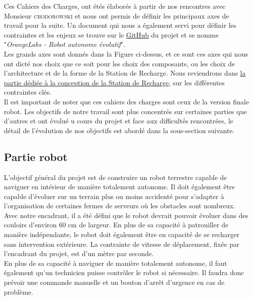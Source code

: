 \documentclass[french]{rapportENSTAB}
\begin{document}
Ces Cahiers des Charges, ont étés élaborés à partir de nos rencontres avec Monsieur \textsc{chodorowski} et nous ont permis de définir les principaux axes de travail pour la suite. Un document qui nous a également servi pour définir les contraintes et les enjeux se trouve sur le  \href{https://github.com/AntoninLize/Projet_OrangeLabs}{GitHub} du projet et se nomme "\textit{OrangeLabs - Robot autonome évolutif}".\\

Les grands axes sont donnés dans la Figure ci-dessus, et ce sont ces axes qui nous ont dicté nos choix que ce soit pour les choix des composants, ou les choix de l'architecture et de la forme de la Station de Recharge. Nous reviendrons dans \hyperlink{partie_station2recharge}{la partie dédiée à la conception de la Station de Recharge}, sur les différentes contraintes clés.\\


Il est important de noter que ces cahiers des charges sont ceux de la version finale robot. Les objectifs de notre travail sont plus concentrés sur certaines parties que d'autres et ont évolué u cours du projet et face aux difficultés rencontrées, le  détail de l'évolution de nos objectifs est abordé dans la sous-section suivante. \\ 

\subsection{Partie robot}

L'objectif général du projet est de construire un robot terrestre capable de naviguer en intérieur de manière totalement autonome. Il doit également être capable d'évoluer sur un terrain plus ou moins accidenté pour s'adapter à l'organisation de certaines fermes de serveurs où les obstacles sont nombreux. Avec notre encadrant, il a été défini que le robot devrait pouvoir évoluer dans des couloirs d'environ 60 cm de largeur. En plus de sa capacité à patrouiller de manière indépendante, le robot doit également être en capacité de se recharger sans intervention extérieure. La contrainte de vitesse de déplacement,  fixée par l'encadrant du projet, est d'un mètre par seconde. \\

En plus de sa capacité à naviguer de manière totalement autonome, il faut également qu'un technicien puisse contrôler le robot si nécessaire. Il faudra donc prévoir une commande manuelle et un bouton d'arrêt d'urgence en cas de problème. \\
\end{document}
